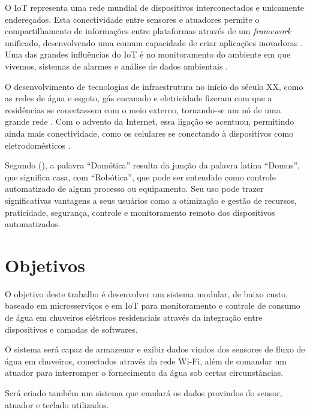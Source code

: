 O IoT representa uma rede mundial de dispositivos interconectados e unicamente endereçados. Esta conectividade entre sensores e atuadores permite o compartilhamento de informações entre plataformas através de um \textit{framework} unificado, desenvolvendo uma comum capacidade de criar aplicações inovadoras  \cite{RisteskaStojkoska2017}. Uma das grandes influências do IoT é no monitoramento do ambiente em que vivemos, sistemas de alarmes e análise de dados ambientais \cite{Perumal2016}. %

O desenvolvimento de tecnologias de infraestrutura no início do século XX, como as redes de água e esgoto, gás encanado e eletricidade fizeram com que a residências se conectassem com o meio externo, tornando-se um nó de uma grande rede \cite{forty2007objetos}. Com o advento da Internet, essa ligação se acentuou, permitindo ainda mais conectividade, como os celulares se conectando à dispositivos como eletrodomésticos \cite{VarelaDeSouza}.

Segundo \citeauthor{VarelaDeSouza} (\citeyear{VarelaDeSouza}), a palavra “Domótica” resulta da junção da palavra latina
“Domus”, que significa casa, com “Robótica”, que pode ser entendido como controle automatizado de algum processo ou equipamento. Seu uso pode trazer significativas vantagens a seus usuários como a otimização e gestão de recursos, praticidade, segurança, controle e monitoramento remoto dos dispositivos automatizados.



\section{Objetivos} 

O objetivo deste trabalho é desenvolver um sistema modular, de baixo custo, baseado em microsserviços e em IoT para monitoramento e controle de consumo de água em chuveiros elétricos residenciais através da integração entre dispositivos e camadas de softwares. 

O sistema será capaz de armazenar e exibir dados vindos dos sensores de fluxo de água em chuveiros, conectados através da rede Wi-Fi, além de comandar um atuador para interromper o fornecimento da água sob certas circunstâncias.

Será criado também um sistema que emulará os dados provindos do sensor, atuador e teclado utilizados.

